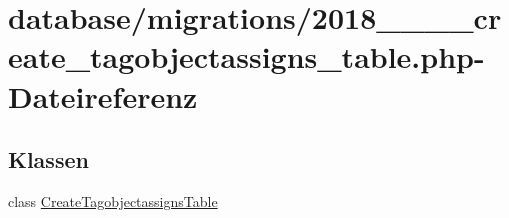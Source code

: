 \hypertarget{2018__06__19__120455__create__tagobjectassigns__table_8php}{}\section{database/migrations/2018\+\_\+\_\+\_\+\_\+create\+\_\+tagobjectassigns\+\_\+table.php-\/\+Dateireferenz}
\label{2018__06__19__120455__create__tagobjectassigns__table_8php}
\subsection*{Klassen}
\begin{DoxyCompactItemize}
\item 
class \hyperlink{classCreateTagobjectassignsTable}{Create\+Tagobjectassigns\+Table}
\end{DoxyCompactItemize}
